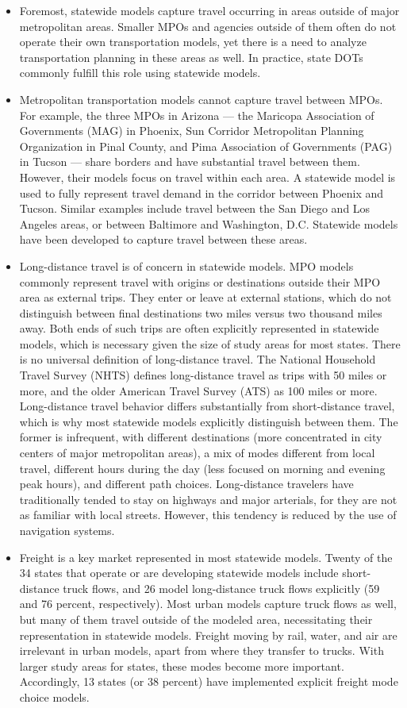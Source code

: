 \begin{itemize}
\item
Foremost, statewide models capture travel occurring in areas outside of major metropolitan areas. Smaller MPOs and agencies outside of them often do not operate their own transportation models, yet there is a need to analyze transportation planning in these areas as well. In practice, state DOTs commonly fulfill this role using statewide models.
\item
Metropolitan transportation models cannot capture travel between MPOs. For example, the three MPOs in Arizona --- the Maricopa Association of Governments (MAG) in Phoenix, Sun Corridor Metropolitan Planning Organization in Pinal County, and Pima Association of Governments (PAG) in Tucson --- share borders and have substantial travel between them. However, their models focus on travel within each area. A statewide model is used to fully represent travel demand in the corridor between Phoenix and Tucson. Similar examples include travel between the San Diego and Los Angeles areas, or between Baltimore and Washington, D.C. Statewide models have been developed to capture travel between these areas.
\item
Long-distance travel is of concern in statewide models. MPO models commonly represent travel with origins or destinations outside their MPO area as external trips. They enter or leave at external stations, which do not distinguish between final destinations two miles versus two thousand miles away. Both ends of such trips are often explicitly represented in statewide models, which is necessary given the size of study areas for most states. There is no universal definition of long-distance travel. The National Household Travel Survey (NHTS) defines long-distance travel as trips with 50 miles or more, and the older American Travel Survey (ATS) as 100 miles or more. Long-distance travel behavior differs substantially from short-distance travel, which is why most statewide models explicitly distinguish between them. The former is infrequent, with different destinations (more concentrated in city centers of major metropolitan areas), a mix of modes different from local travel, different hours during the day (less focused on morning and evening peak hours), and different path choices. Long-distance travelers have traditionally tended to stay on highways and major arterials, for they are not as familiar with local streets. However, this tendency is reduced by the use of navigation systems.
\item
Freight is a key market represented in most statewide models. Twenty of the 34 states that operate or are developing statewide models include short-distance truck flows, and 26 model long-distance truck flows explicitly (59 and 76 percent, respectively). Most urban models capture truck flows as well, but many of them travel outside of the modeled area, necessitating their representation in statewide models. Freight moving by rail, water, and air are irrelevant in urban models, apart from where they transfer to trucks. With larger study areas for states, these modes become more important. Accordingly, 13 states (or 38 percent) have implemented explicit freight mode choice models.

\end{itemize}
